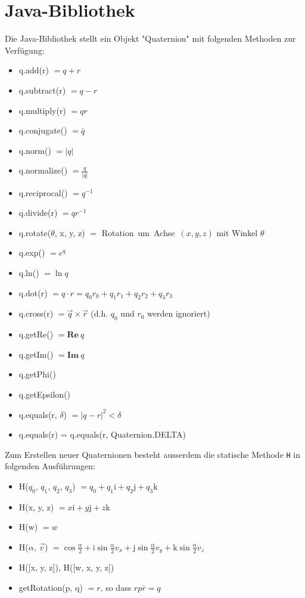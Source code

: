 \documentclass[12pt]{article}
\begin{document}
  \section{Java-Bibliothek}

  Die Java-Bibliothek stellt ein Objekt "Quaternion" mit folgenden Methoden zur Verfügung:
  \begin{itemize}
    \item q.add(r) $= q + r$
    \item q.subtract(r) $= q - r$
    \item q.multiply(r) $= q r$
    \item q.conjugate() $= \bar{q}$
    \item q.norm() $= \lvert q \rvert$
    \item q.normalize() $= \frac{q}{\lvert q \rvert}$
    \item q.reciprocal() $= q^{-1}$
    \item q.divide(r) $= q r^{-1}$
    \item q.rotate($\theta$, x, y, z) $=$ Rotation\ um\ Achse\ $(x, y, z)$ mit Winkel $\theta$
    \item q.exp() $= e^q$
    \item q.ln() $= \ln q$
    \item q.dot(r) $= q \cdot r = q_0 r_0 + q_1 r_1 + q_2 r_2 + q_3 r_3$
    \item q.cross(r) $= \vec{q} \times \vec{r}$ (d.h. $q_0$ und $r_0$ werden ignoriert)
    \item q.getRe() $= \mathbf{Re}\ q$
    \item q.getIm() $= \mathbf{Im}\ q$
    \item q.getPhi()
    \item q.getEpsilon()
    \item q.equals(r, $\delta$) $= |q - r|^2 < \delta$
    \item q.equals(r) = q.equals(r, Quaternion.DELTA)
  \end{itemize}

  Zum Erstellen neuer Quaternionen besteht ausserdem die statische Methode \texttt{H} in folgenden Ausführungen:
  \begin{itemize}
    \item H($q_0$, $q_1$, $q_2$, $q_3$) $= q_0 + q_1 \mathrm{i} + q_2 \mathrm{j} + q_3 \mathrm{k}$
    \item H(x, y, z) $= x \mathrm{i} + y \mathrm{j} + z \mathrm{k}$
    \item H(w) $= w$
    \item H($\alpha$, $\vec{v}$) $= \cos\frac{\alpha}{2} + \mathrm{i} \sin\frac{\alpha}{2} v_x + \mathrm{j} \sin\frac{\alpha}{2} v_y + \mathrm{k} \sin\frac{\alpha}{2} v_z$
    \item H([x, y, z]), H([w, x, y, z])
    \item getRotation(p, q) $= r$, so dass $r p \bar{r} = q$
  \end{itemize}
\end{document}
